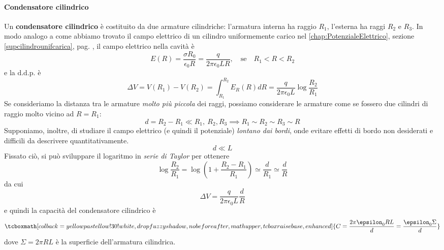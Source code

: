 \paragraph{Condensatore cilindrico}
Un \textbf{condensatore cilindrico} è costituito da due armature cilindriche: l'armatura interna ha raggio $R_1$, l'esterna ha raggi $R_2$ e $R_3$.
In modo analogo a come abbiamo trovato il campo elettrico di un cilindro uniformemente carico nel \autoref{chap:PotenzialeElettrico}, sezione \ref{supcilindrounifcarica}, pag. \pageref{supcilindrounifcarica}, il campo elettrico nella cavità è
\begin{equation*}
	E(R)=\frac{\sigma R_0}{\epsilon_0 R}=\frac{q}{2\pi\epsilon_0L R},\quad\text{se}\quad R_1<R<R_2
\end{equation*}
e la $\textrm{d.d.p.}$ è
\begin{equation*}
	\Delta V=V(R_1)-V(R_2)=\int_{R_1}^{R_2}E_R(R)dR=\frac{q}{2\pi\epsilon_0L}\log\frac{R_2}{R_1}
\end{equation*}
Se consideriamo la distanza tra le armature \textit{molto più piccola} dei raggi, possiamo considerare le armature come se fossero due cilindri di raggio molto vicino ad $R=R_1$:
\begin{equation*}
	d=R_2-R_1\ll R_1,\ R_2, R_3\implies R_1\sim R_2\sim R_3\sim R
\end{equation*}
Supponiamo, inoltre, di studiare il campo elettrico (e quindi il potenziale) \textit{lontano dai bordi}, onde evitare effetti di bordo non desiderati e difficili da descrivere quantitativamente.
\begin{equation*}
	d\ll L
\end{equation*}
Fissato ciò, si può sviluppare il logaritmo in \textit{serie di Taylor} per ottenere
\begin{equation*}
	\log\frac{R_2}{R_1}=\log\left(1+\frac{R_2-R_1}{R_1}\right)\simeq\frac{d}{R_1}\simeq\frac{d}{R}
\end{equation*}
da cui
\begin{equation*}
	\Delta V=\frac{q}{2\pi\epsilon_0L}\frac{d}{R}
\end{equation*}
e quindi la capacità del condensatore cilindrico è
\begin{equation}
	\tcboxmath[colback=yellowpastellow!30!white,drop fuzzy shadow, nobeforeafter, math upper, tcbox raise base, enhanced]{C=\frac{2\pi\epsilon_0RL}{d}=\frac{\epsilon_0\Sigma}{d}}
\end{equation}
dove $\Sigma=2\pi RL$ è la superficie dell'armatura cilindrica.
